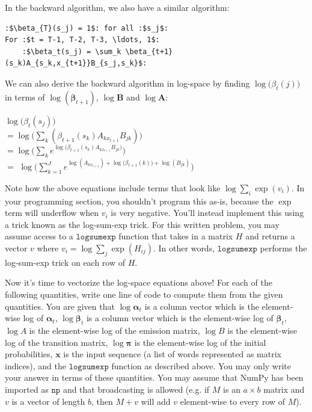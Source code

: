 \documentclass[11pt,addpoints,answers]{exam}
\newcommand{\Av}{\mathbf{A}}
\newcommand{\Bv}{\mathbf{B}}
\newcommand{\alphav     }{\boldsymbol \alpha     }
\newcommand{\betav      }{\boldsymbol \beta      }
\begin{document}
\begin{questions}
\begin{parts}
\vspace{0.3 in}
In the backward algorithm, we also have a similar algorithm:
\begin{lstlisting}[escapechar=:]
:$\beta_{T}(s_j) = 1$: for all :$s_j$:
For :$t = T-1, T-2, T-3, \ldots, 1$:
    :$\beta_t(s_j) = \sum_k \beta_{t+1}(s_k)A_{s_k,x_{t+1}}B_{s_j,s_k}$:
\end{lstlisting}
    \vspace{0.25in}


    We can also derive the backward algorithm in log-space by finding $\log\big(\beta_t(j) \big)$ in terms of $\log(\betav_{t+1})$, $\log\Bv$ and $\log \Av$:
    
    $\log\big(\beta_t(s_j)\big)$\\[0.05 in]
    $= \log \big(\sum_k(\beta_{t+1}(s_k)A_{kx_{t+1}}B_{jk}) \big)$\\[0.05 in]
    $= \log \bigg(\sum_k e^{\log \big(\beta_{t+1}(s_k)A_{kx_{t+1}}B_{jk} \big)} \bigg)$\\[0.05 in]
    $= $ $ \log \bigg(\sum_{k=1}^J e^{\log(A_{kx_{t+1}}) + \log\big(\beta_{t+1}(k)\big) + \log(B_{jk})} \bigg)$
    
    Note how the above equations include terms that look like $\log \sum_{i} \exp(v_i)$. In your programming section, you shouldn't program this as-is, because the $\exp$ term will underflow when $v_i$ is very negative. You'll instead implement this using a trick known as the log-sum-exp trick. For this written problem, you may assume access to a $\texttt{logsumexp}$ function that takes in a matrix $H$ and returns a vector $v$ where $v_i = \log \sum_{j} \exp (H_{ij})$. In other words, $\texttt{logsumexp}$ performs the log-sum-exp trick on each row of $H$.

    Now it's time to vectorize the log-space equations above! For each of the following quantities, write one line of code to compute them from the given quantities. You are given that $\log\alphav_t$ is a column vector which is the element-wise log of $\alphav_t$, $\log\betav_t$ is a column vector which is the element-wise log of $\betav_t$, $\log A$ is the element-wise log of the emission matrix, $\log B$ is the element-wise log of the transition matrix, $\log \bm\pi$ is the element-wise log of the initial probabilities, $\mathbf{x}$ is the input sequence (a list of words represented as matrix indices), and the $\texttt{logsumexp}$ function as described above. You may only write your answer in terms of these quantities. You may assume that NumPy has been imported as $\texttt{np}$ and that broadcasting is allowed (e.g. if $M$ is an $a\times b$ matrix and $v$ is a vector of length $b$, then $M + v$ will add $v$ element-wise to every row of $M$).
    

\end{parts}
\end{questions}
\end{document}
